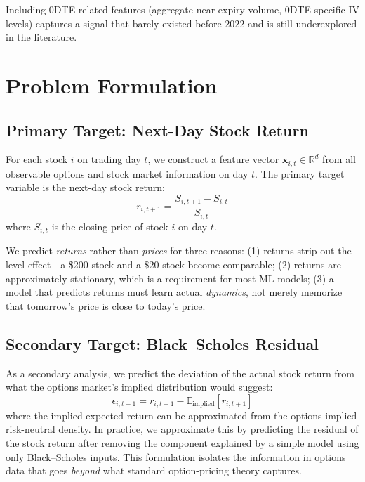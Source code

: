 \documentclass[11pt,a4paper]{article}
\begin{document}
Including 0DTE-related features (aggregate near-expiry volume, 0DTE-specific IV levels) captures a signal that barely existed before 2022 and is still underexplored in the literature.


\section{Problem Formulation}

\subsection{Primary Target: Next-Day Stock Return}

For each stock $i$ on trading day $t$, we construct a feature vector $\mathbf{x}_{i,t} \in \mathbb{R}^{d}$ from all observable options and stock market information on day $t$. The primary target variable is the next-day stock return:
\begin{equation}
r_{i,t+1} = \frac{S_{i,t+1} - S_{i,t}}{S_{i,t}}
\end{equation}
where $S_{i,t}$ is the closing price of stock $i$ on day $t$.

\begin{designchoice}
We predict \emph{returns} rather than \emph{prices} for three reasons: (1) returns strip out the level effect---a \$200 stock and a \$20 stock become comparable; (2) returns are approximately stationary, which is a requirement for most ML models; (3) a model that predicts returns must learn actual \emph{dynamics}, not merely memorize that tomorrow's price is close to today's price.
\end{designchoice}

\subsection{Secondary Target: Black--Scholes Residual}

As a secondary analysis, we predict the deviation of the actual stock return from what the options market's implied distribution would suggest:
\begin{equation}
\epsilon_{i,t+1} = r_{i,t+1} - \mathbb{E}_{\text{implied}}[r_{i,t+1}]
\end{equation}
where the implied expected return can be approximated from the options-implied risk-neutral density. In practice, we approximate this by predicting the residual of the stock return after removing the component explained by a simple model using only Black--Scholes inputs. This formulation isolates the information in options data that goes \emph{beyond} what standard option-pricing theory captures.
\end{document}

